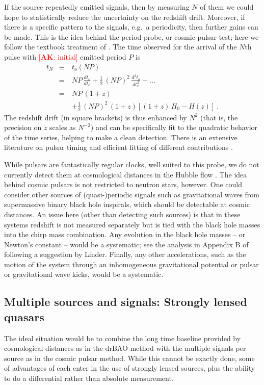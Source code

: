 \documentclass[preprint2, 10pt]{aastex}
\newcommand{\bea}{\begin{eqnarray}}
\newcommand{\eea}{\end{eqnarray}}
\newcommand{\alex}[1]{\textcolor{red}{[{\bf AK}: #1]}}
\begin{document}
If the source repeatedly emitted signals, then by measuring $N$ of them 
we could hope to statistically reduce the uncertainty on the redshift drift.  
Moreover, if there 
is a specific pattern to the signals, e.g.\ a periodicity, then further 
gains can be made.  This is the idea behind the period probe, or cosmic 
pulsar test; here we follow the textbook treatment of \citet{fpoc}.  The time 
observed for the arrival of the $N$th pulse with \alex{initial} emitted period $P$ is 
\bea 
t_N&\equiv& t_o(NP)\nonumber\\ 
&=&NP\,\frac{dt_o}{dt_e}+\frac{1}{2}\,(NP)^2\,\frac{d^2t_o}{dt_e^2}+\dots\\ 
&=&NP\,(1+z)\nonumber\\ 
&\quad&+\frac{1}{2}\,(NP)^2\,(1+z)\left[(1+z)\,H_0-H(z)\right]\ . 
\eea 
The redshift drift (in square brackets) is thus enhanced by $N^2$ (that 
is, the precision on $\dot z$ scales as $N^{-2}$) and 
can be specifically fit to the quadratic behavior of the time series, 
helping to make a clean detection.  There is an extensive literature on 
pulsar timing and efficient fitting of different contributions 
\citep{pulsars}. 

While pulsars are fantastically regular clocks, well suited to this probe, 
we do not currently detect them at cosmological distances in the Hubble 
flow \citep[but see][]{13071628}.  The idea behind cosmic pulsars is not 
restricted to neutron stars, however.  
One could consider other sources of (quasi-)periodic signals such as 
gravitational waves from supermassive binary black hole inspirals, which 
should be detectable 
at cosmic distances.  An issue here (other than detecting such sources) 
is that in these systems redshift is not measured separately but is tied 
with the black hole masses into the chirp mass combination.  Any evolution 
in the black hole masses -- or Newton's constant -- would be a systematic; 
see the analysis in Appendix B of \citet{09122724} following a suggestion 
by Linder.  Finally, any other accelerations, such as the motion of the system 
through an inhomogeneous gravitational potential or pulsar or gravitational 
wave kicks, would be a systematic. 


\subsection{Multiple sources and signals: Strongly lensed quasars} \label{sec:lens} 

The ideal situation would be to combine the long time baseline provided 
by cosmological distances as in the drBAO method with the multiple 
signals per source as in the cosmic pulsar method.  While this cannot be 
exactly done, some of advantages of each enter in the use of strongly 
lensed sources, plus the ability to do a differential rather than absolute 
measurement. 
\end{document}

